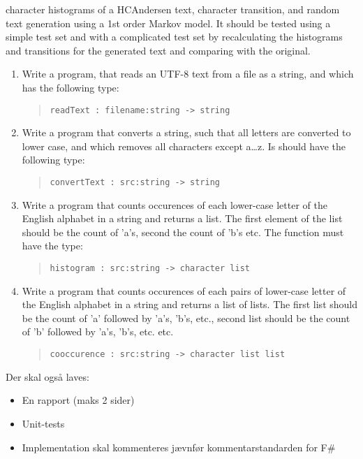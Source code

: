character histograms of a HCAndersen text, character transition, and
random text generation using a 1st order Markov model. It should be
tested using a simple test set and with a complicated test set by
recalculating the histograms and transitions for the generated text
and comparing with the original.



\begin{enumerate}
\item Write a program, that reads an UTF-8 text from a file as a
  string, and which has the following type:
  \begin{quote}
    \mbox{\lstinline!readText : filename:string -> string!}
  \end{quote}
\item Write a program that converts a string, such that all letters
  are converted to lower case, and which removes all characters except
  a\ldots z. Is should have the following type:
  \begin{quote}
    \mbox{\lstinline!convertText : src:string -> string!}
  \end{quote}
\item Write a program that counts occurences of each lower-case letter
  of the English alphabet in a string and returns a list. The first
  element of the list should be the count of 'a's, second the count of
  'b's etc. The function must have the type:
  \begin{quote}
    \mbox{\lstinline!histogram : src:string -> character list!}
  \end{quote}
\item Write a program that counts occurences of each pairs of lower-case letter
  of the English alphabet in a string and returns a list of lists. The first
  list should be the count of 'a' followed by 'a's, 'b's, etc., second
  list should be the count of 'b' followed by 'a's, 'b's, etc. etc.
  \begin{quote}
    \mbox{\lstinline!cooccurence : src:string -> character list list!}
  \end{quote}
\end{enumerate}
Der skal også laves:
\begin{itemize}
\item En rapport (maks 2 sider)
\item Unit-tests
\item Implementation skal kommenteres jævnfør kommentarstandarden for F\#
\end{itemize}
